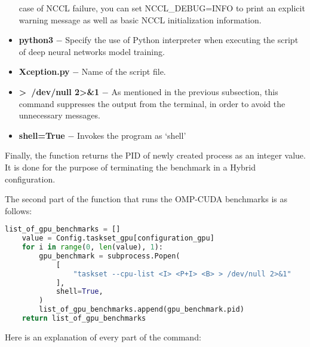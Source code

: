 \begin{itemize}
    case of NCCL failure, you can set NCCL\_DEBUG=INFO to print an explicit
    warning message as well as basic NCCL initialization information.
    \item \textbf{python3} $-$ Specify the use of Python interpreter when
    executing the script of deep neural networks model training.
    \item \textbf{Xception.py} $-$ Name of the script file.
    \item \textbf{\textgreater~/dev/null 2\textgreater\&1} $-$
    As mentioned in the previous subsection, this command suppresses the
    output from the terminal, in order to avoid the unnecessary messages.
    \item \textbf{shell=True} $-$ Invokes the program as `shell'
\end{itemize}

Finally, the function returns the PID of newly created process
as an integer value. It is done for the purpose of terminating the
benchmark in a Hybrid configuration.

\newpage

The second part of the function that runs the OMP-CUDA benchmarks is as
follows:

\begin{lstlisting}[language=Python]
    list_of_gpu_benchmarks = []
    value = Config.taskset_gpu[configuration_gpu]
    for i in range(0, len(value), 1):
        gpu_benchmark = subprocess.Popen(
            [
                "taskset --cpu-list <I> <P+I> <B> > /dev/null 2>&1"
            ],
            shell=True,
        )
        list_of_gpu_benchmarks.append(gpu_benchmark.pid)
    return list_of_gpu_benchmarks
\end{lstlisting}

Here is an explanation of every part of the command:

